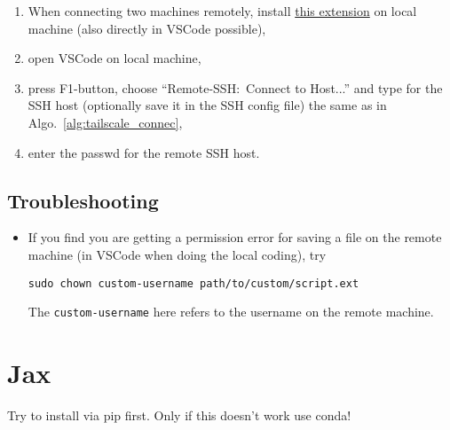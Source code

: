 \documentclass[12pt, a4paper]{article}
\numberwithin{equation}{section}
\theoremstyle{definition}
\theoremstyle{definition}
\begin{document}
		\begin{enumerate}
			\item When connecting two machines remotely, install \href{https://marketplace.visualstudio.com/items?itemName=ms-vscode-remote.vscode-remote-extensionpack}{this extension} on local machine (also directly in VSCode possible), 
			\item open VSCode on local machine, 
			\item press F1-button, choose \enquote{Remote-SSH:~Connect to Host...} and type for the SSH host (optionally save it in the SSH config file) the same as in Algo.~\eqref{alg:tailscale_connec}, 
			\item enter the passwd for the remote SSH host. 
		\end{enumerate}	

	\subsection{Troubleshooting}
	
		\begin{itemize}
			\item If you find you are getting a permission error for saving a file on the remote machine (in VSCode when doing the local coding), try
			
			\begin{lstlisting}[style=mystylebash, label=alg:remote_troubleshooting, xleftmargin=\parindent]
				sudo chown custom-username path/to/custom/script.ext
			\end{lstlisting}
			
			The \texttt{custom-username} here refers to the username on the remote machine.
			
		\end{itemize}
	
	\newpage	
	
	\section{Jax}
	
	Try to install via pip first. Only if this doesn't work use conda!
	
\end{document}
